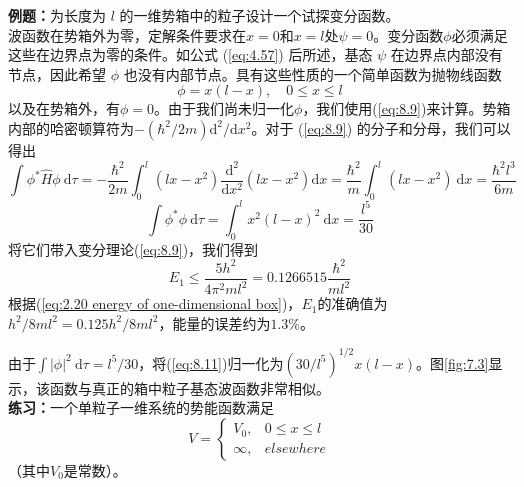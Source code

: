     \begin{examplebox}
        \textbf{例题：}为长度为 $l$ 的一维势箱中的粒子设计一个试探变分函数。
        \\

        波函数在势箱外为零，定解条件要求在$x=0$和$x=l$处$\psi=0$。变分函数$\phi$必须满足这些在边界点为零的条件。如公式 (\ref{eq:4.57}) 后所述，基态 $\psi$ 在边界点内部没有节点，因此希望 $\phi$ 也没有内部节点。具有这些性质的一个简单函数为抛物线函数
        \begin{equation}
            \phi = x\left(l-x\right), \quad 0 \leq x \leq l
            \label{eq:8.11}
        \end{equation}
        以及在势箱外，有$\phi=0$。由于我们尚未归一化$\phi$，我们使用(\ref{eq:8.9})来计算。势箱内部的哈密顿算符为$-\left(\hbar^2/2m\right)\mathrm{d}^2/\mathrm{d}x^2$。对于 (\ref{eq:8.9}) 的分子和分母，我们可以得出
        \begin{equation}
            \int \phi^{\ast} \hat{H}\phi \:\mathrm{d}\tau = -\frac{\hbar^2}{2m} \int_{0}^{l} \left(lx-x^2\right)\frac{\mathrm{d}^2}{\mathrm{d}x^2} \left(lx-x^2\right) \mathrm{d}x = \frac{\hbar^2}{m} \int_0^l \left(lx-x^2\right) \:\mathrm{d}x = \frac{\hbar^2 l^3}{6m}
            \label{eq:8.12}
        \end{equation}
        \begin{equation}
            \int \phi^{\ast} \phi \:\mathrm{d}\tau = \int_0^l x^2\left(l-x\right)^2 \:\mathrm{d}x = \frac{l^5}{30}
            \label{eq:8.13}
        \end{equation}
        将它们带入变分理论(\ref{eq:8.9})，我们得到
        \begin{equation*}
            E_1 \leq \frac{5h^2}{4\pi^2 ml^2} = 0.1266515\frac{\hbar^2}{ml^2}
        \end{equation*}
        根据(\ref{eq:2.20 energy of one-dimensional box})，$E_1$的准确值为$h^2/8ml^2=0.125h^2/8ml^2$，能量的误差约为$1.3\%$。

        由于$\int \left|\phi\right|^2 \: \mathrm{d}\tau = l^5/30$，将(\ref{eq:8.11})归一化为$\left(30/l^5\right)^{1/2} x\left(l-x\right)$。图\ref{fig:7.3}显示，该函数与真正的箱中粒子基态波函数非常相似。
        \\

        \textbf{练习：}一个单粒子一维系统的势能函数满足
        \begin{equation*}
            V = \begin{cases}
                V_0, & 0 \leq x \leq l \\
                \infty, & elsewhere
            \end{cases}
        \end{equation*}
        （其中$V_0$是常数）。


\end{examplebox}
